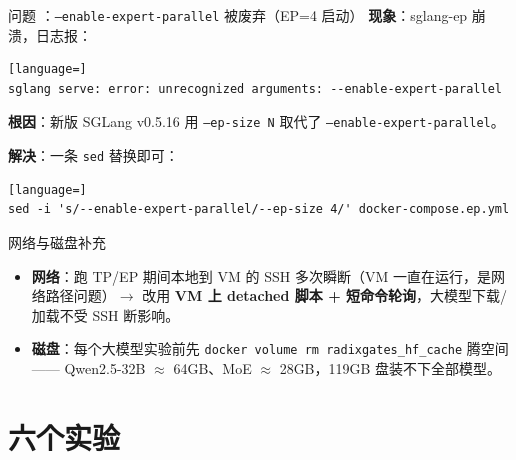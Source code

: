\documentclass[aspectratio=169,11pt]{beamer}
\newcommand{\gc}[1]{\texttt{\small #1}}   %
\newcommand{\cnum}[1]{\tikz[baseline=(c.base)]{\node[draw,circle,inner sep=1.2pt,line width=0.5pt](c){\scriptsize #1};}}
\begin{document}
\begin{frame}[fragile]{问题 \cnum{4}：\gc{--enable-expert-parallel} 被废弃（EP=4 启动）}
\textbf{现象}：sglang-ep 崩溃，日志报：
\begin{lstlisting}[language=]
sglang serve: error: unrecognized arguments: --enable-expert-parallel
\end{lstlisting}
\textbf{根因}：新版 SGLang v0.5.16 用 \gc{--ep-size N} 取代了 \gc{--enable-expert-parallel}。
\vspace{1mm}

\textbf{解决}：一条 \gc{sed} 替换即可：
\begin{lstlisting}[language=]
sed -i 's/--enable-expert-parallel/--ep-size 4/' docker-compose.ep.yml
\end{lstlisting}
\vfill
\begin{block}{网络与磁盘补充}
\scriptsize
\begin{itemize}
  \item \textbf{网络}：跑 TP/EP 期间本地到 VM 的 SSH 多次瞬断（VM 一直在运行，是网络路径问题）$\to$ 改用
  \textbf{VM 上 detached 脚本 + 短命令轮询}，大模型下载/加载不受 SSH 断影响。
  \item \textbf{磁盘}：每个大模型实验前先 \gc{docker volume rm radixgates\_hf\_cache} 腾空间——
  Qwen2.5-32B $\approx$ 64GB、MoE $\approx$ 28GB，119GB 盘装不下全部模型。
\end{itemize}
\end{block}
\end{frame}

\section*{六个实验}
\end{document}
